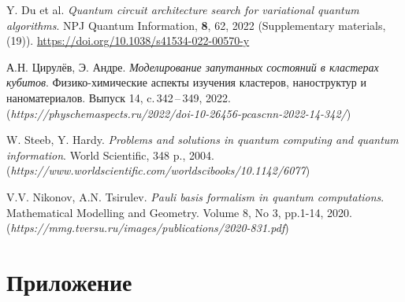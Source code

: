 \documentclass[a4paper]{report}
\begin{document}
\begin{thebibliography}{99}

Y. Du et al. \textit{Quantum circuit architecture search for variational quantum algorithms}. NPJ Quantum Information, \textbf{8}, 62, 2022 (Supplementary materials, (19)). \url{https://doi.org/10.1038/s41534-022-00570-y}

А.Н. Цирулёв, Э. Андре. \textit{Моделирование запутанных состояний в кластерах кубитов}. Физико-химические аспекты изучения кластеров, наноструктур и наноматериалов. Выпуск 14, c.\,342\,--\,349, 2022.\\
(\textit{https://physchemaspects.ru/2022/doi-10-26456-pcascnn-2022-14-342/})

W. Steeb, Y. Hardy. \textit{Problems and solutions in quantum computing and quantum information}. World Scientific, 348 p., 2004.\\
(\textit{https://www.worldscientific.com/worldscibooks/10.1142/6077})

V.V. Nikonov, A.N. Tsirulev. \textit{Pauli basis formalism in quantum computations}. Mathematical Modelling and Geometry. Volume 8, No 3, pp.1-14, 2020.\\
(\textit{https://mmg.tversu.ru/images/publications/2020-831.pdf})

\end{thebibliography}


\newpage
{}
\section*{Приложение}
\end{document}

